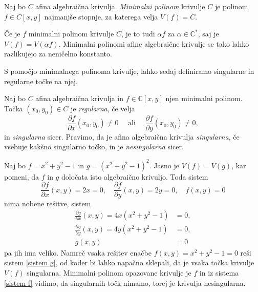 \documentclass[mat1]{fmfdelo}
\numberwithin{equation}{section}
\newcommand{\C}{\mathbb C}
\newcommand{\CM}{\mathbb C ^*}
\newcommand{\pdv}[2][]{\frac{\partial#1}{\partial#2}}
\theoremstyle{definition}
\begin{document}
\begin{definicija}
    Naj bo $C$ afina algebraična krivulja. \emph{Minimalni polinom} krivulje $C$ je polinom $f \in C[x,y]$ najmanjše stopnje, za katerega velja $V(f) = C$.
\end{definicija}

\begin{opomba}
    Če je $f$ minimalni polinom krivulje $C$, je to tudi $\alpha f$ za $\alpha \in \CM$, saj je $V(f) = V(\alpha f)$. Minimalni polinomi afine algebraične krivulje se tako lahko razlikujejo za neničelno konstanto.
\end{opomba}

S pomočjo minimalnega polinoma krivulje, lahko sedaj definiramo singularne in regularne točke na njej.

\begin{definicija}
    \label{reg sing tocke}
    Naj bo $C$ afina algebraična krivulja in $f \in \C[x,y]$ njen minimalni polinom. Točka $(x_0, y_0) \in C$ je \emph{regularna}, če velja
    \[
        \frac{\partial f}{\partial x}(x_0, y_0) \neq 0 \quad \text{ ali } \quad \frac{\partial f}{\partial y}(x_0, y_0) \neq 0,
    \] 
    in \emph{singularna} sicer. Pravimo, da je afina algebraična krivulja \emph{singularna}, če vsebuje kakšno singularno točko, in je \emph{nesingularna} sicer.
\end{definicija}

\begin{primer*}
    Naj bo $f = x^2 + y^2 - 1$ in $g = (x^2 + y^2 - 1)^2$. Jasno je $V(f) = V(g)$, kar pomeni, da $f$ in $g$ določata isto algebraično krivuljo. Toda sistem 
    \begin{equation}
        \label{sistem f}
        \pdv[f]{x}(x,y) = 2x = 0, \quad \pdv[f]{y}(x,y) = 2y = 0, \quad f(x,y) = 0
    \end{equation}
    nima nobene rešitve, sistem
    \begin{align}
        \label{sistem g}
        \pdv[g]{x}(x,y) = 4x(x^2 + y^2 - 1) &= 0, \nonumber \\ 
        \pdv[g]{y}(x,y) = 4y(x^2 + y^2 - 1) &= 0, \\
        g(x,y) &= 0 \nonumber
    \end{align}
    pa jih ima veliko. Namreč vsaka rešitev enačbe $f(x,y) = x^2 + y^2 - 1 = 0$ reši sistem \eqref{sistem g}, od koder bi lahko napačno sklepali, da je vsaka točka krivulje $V(f)$ singularna. Minimalni polinom opazovane krivulje je $f$ in iz sistema \eqref{sistem f} vidimo, da singularnih točk nimamo, torej je krivulja nesingularna. 
    
\end{primer*}
\end{document}
